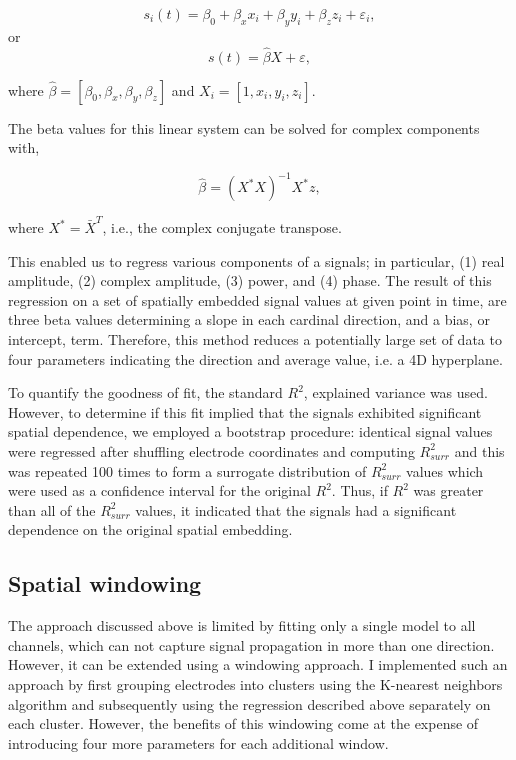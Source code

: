 $$s_i(t) = \beta_0 + \beta_x x_i + \beta_y y_i + \beta_z z_i + \varepsilon_i,$$ 
or
$$s(t) = \hat{\beta}X + \varepsilon,$$

where $\hat{\beta} = [\beta_0, \beta_x, \beta_y, \beta_z]$ and $X_i = [1,x_i,y_i,z_i].$

The beta values for this linear system can be solved for complex components with,

$$\hat\beta = \left(X^*X\right)^{-1}X^* z,$$

where $X^* = \bar{X}^T$, i.e., the complex conjugate transpose.

This enabled us to regress various components of a signals; in particular, (1) real amplitude, (2) complex amplitude, (3) power, and (4) phase. The result of this regression on a set of spatially embedded signal values at given point in time, are three beta values determining a slope in each cardinal direction, and a bias, or intercept, term. Therefore, this method reduces a potentially large set of data to four parameters indicating the direction and average value, i.e. a 4D hyperplane.

To quantify the goodness of fit, the standard $R^2$, explained variance was used. However, to determine if this fit implied that the signals exhibited significant spatial dependence, we employed a bootstrap procedure: identical signal values were regressed after shuffling electrode coordinates and computing $R_{surr}^2$ and this was repeated 100 times to form a surrogate distribution of $R_{surr}^2$ values which were used as a confidence interval for the original $R^2$. Thus, if $R^2$ was greater than all of the $R_{surr}^2$ values, it indicated that the signals had a significant dependence on the original spatial embedding.   

\subsection*{Spatial windowing}
The approach discussed above is limited by fitting only a single model to all channels, which can not capture signal propagation in more than one direction. However, it can be extended using a windowing approach. I implemented such an approach by first grouping electrodes into clusters using the K-nearest neighbors algorithm and subsequently using the regression described above separately on each cluster. However, the benefits of this windowing come at the expense of introducing four more parameters for each additional window.



